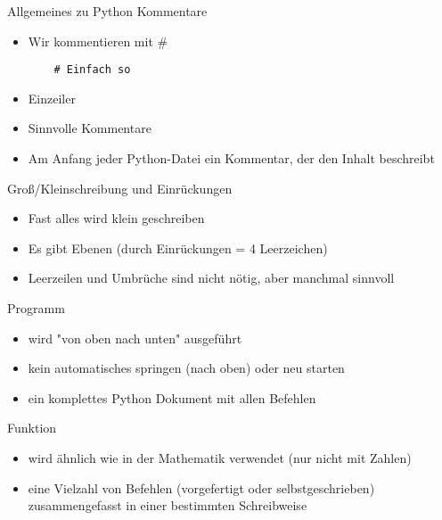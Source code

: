 \begin{frame}[fragile]{Allgemeines zu Python}
Kommentare
\begin{itemize}
	\item Wir kommentieren mit \#
	
	\begin{lstlisting}
	# Einfach so
	\end{lstlisting}

	\item Einzeiler
	\item Sinnvolle Kommentare
	\item Am Anfang jeder Python-Datei ein Kommentar, der den Inhalt beschreibt
\end{itemize}
\end{frame}

\begin{frame}[fragile]{Groß/Kleinschreibung und Einrückungen }

\begin{itemize}
	\item Fast alles wird klein geschreiben
	\item Es gibt Ebenen (durch Einrückungen = 4 Leerzeichen)
	\item Leerzeilen und Umbrüche sind nicht nötig, aber manchmal sinnvoll 
	
\end{itemize}
\end{frame}

\begin{frame}{Programm}
\begin{itemize}
	\item wird "von oben nach unten" ausgeführt
	\item kein automatisches springen (nach oben) oder neu starten
	\item ein komplettes Python Dokument mit allen Befehlen
\end{itemize}
\end{frame}

\begin{frame}{Funktion}
	\begin{itemize}
	\item wird ähnlich wie in der Mathematik verwendet (nur nicht mit Zahlen)
	\item eine Vielzahl von Befehlen (vorgefertigt oder selbstgeschrieben) zusammengefasst in einer bestimmten Schreibweise	
	\end{itemize}
\end{frame}

